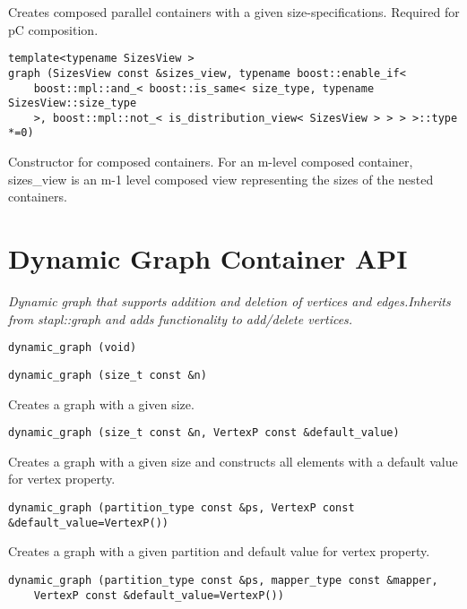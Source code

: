 Creates composed parallel containers with a given size-specifications. Required for pC composition. 
 
\begin{verbatim}
template<typename SizesView >
graph (SizesView const &sizes_view, typename boost::enable_if< 
    boost::mpl::and_< boost::is_same< size_type, typename SizesView::size_type
    >, boost::mpl::not_< is_distribution_view< SizesView > > > >::type *=0)
\end{verbatim}

Constructor for composed containers. For an m-level composed container, sizes\_view is an m-1 level composed view representing the sizes of the nested containers. 


\section{Dynamic Graph Container API } \label{sec-dygraf-cont}

\emph{ Dynamic graph that supports addition and deletion of vertices and edges.Inherits from stapl::graph and adds functionality to add/delete vertices. }

\begin{verbatim}
dynamic_graph (void)
\end{verbatim}
 
\begin{verbatim}
dynamic_graph (size_t const &n)
\end{verbatim}

Creates a graph with a given size. 
 
\begin{verbatim}
dynamic_graph (size_t const &n, VertexP const &default_value)
\end{verbatim}

Creates a graph with a given size and constructs all elements with a default value for vertex property. 
 
\begin{verbatim}
dynamic_graph (partition_type const &ps, VertexP const &default_value=VertexP())
\end{verbatim}

Creates a graph with a given partition and default value for vertex property. 
 
\begin{verbatim}
dynamic_graph (partition_type const &ps, mapper_type const &mapper, 
    VertexP const &default_value=VertexP())
\end{verbatim}

